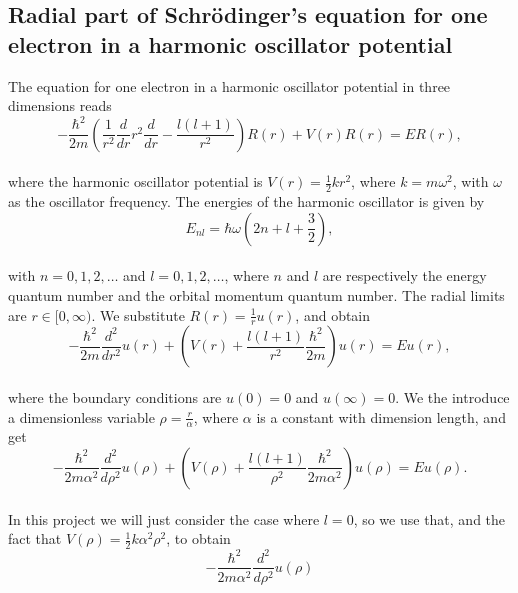 \documentclass[12pt]{article}
\begin{document}
\begin{flushleft}
\subsection{Radial part of Schr\"odinger's equation for one electron in a harmonic oscillator potential}
The equation for one electron in a harmonic oscillator potential in three dimensions reads\\
\vspace{5mm}
$$-\frac{\hbar^2}{2 m} \left ( \frac{1}{r^2} \frac{d}{dr} r^2
  \frac{d}{dr} - \frac{l (l + 1)}{r^2} \right )R(r) 
     + V(r) R(r) = E R(r),$$\\
     \vspace{5mm}
where the harmonic oscillator potential is $V(r)=\frac{1}{2} kr^2$, where $k=m\omega^2$, with $\omega$ as the oscillator frequency. The energies of the harmonic oscillator is given by\\
\vspace{5mm} 
$$E_{nl}=  \hbar \omega \left(2n+l+\frac{3}{2}\right),$$\\
\vspace{5mm}
with $n=0,1,2,\dots$ and $l=0,1,2,\dots$, where $n$ and $l$ are respectively the energy quantum number and the orbital momentum quantum number.
\newpage 
The radial limits are $r\in [0,\infty)$. We substitute $R(r) =\frac{1}{r} u(r)$, and obtain\\
\vspace{5mm}
$$-\frac{\hbar^2}{2 m} \frac{d^2}{dr^2} u(r) 
       + \left ( V(r) + \frac{l (l + 1)}{r^2}\frac{\hbar^2}{2 m} \right ) u(r)  = E u(r),$$\\
\vspace{5mm}
where the boundary conditions are $u(0)=0$ and $u(\infty)=0$. We the introduce a dimensionless variable $\rho = \frac{r}{\alpha}$, where $\alpha$ is a constant with dimension length, and get
\vspace{5mm}
$$-\frac{\hbar^2}{2 m \alpha^2} \frac{d^2}{d\rho^2} u(\rho) 
       + \left ( V(\rho) + \frac{l (l + 1)}{\rho^2}
         \frac{\hbar^2}{2 m\alpha^2} \right ) u(\rho)  = E u(\rho).$$\\
\vspace{5mm}
In this project we will just consider the case where $l=0$, so we use that, and the fact that $V(\rho) = \frac{1}{2} k \alpha^2\rho^2$, to obtain\\
\vspace{5mm}
\begin{equation}\label{eq:SL_before_2e}
-\frac{\hbar^2}{2 m \alpha^2} \frac{d^2}{d\rho^2} u(\rho) 

\end{equation}
\end{flushleft}
\end{document}
